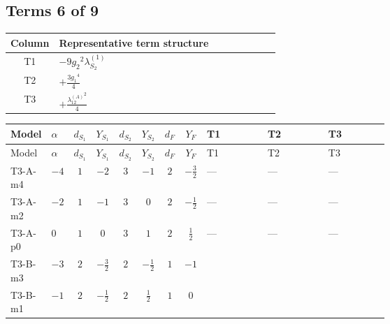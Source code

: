 \documentclass[8pt]{article}
\begin{document}
\begin{landscape}
\subsection*{Terms 6 of 9}
\begin{center}
\begin{tabular}{@{}c >{\raggedright\arraybackslash}p{0.82\linewidth}@{}}
\toprule
Column & Representative term structure \\
\midrule
T1 & \(\displaystyle -9 {g_2}^2 {\lambda_{S_2}^{(1)}}\) \\
\midrule
T2 & \(\displaystyle +\frac{3 {g_1}^4}{4}\) \\
\midrule
T3 & \(\displaystyle +\frac{{\lambda_{12}^{(A)}}^2}{4}\) \\
\midrule
\bottomrule
\end{tabular}
\end{center}
\smallskip
\tiny
\begin{longtable}{@{}llcccccc >{\raggedright\arraybackslash}p{0.21\linewidth} >{\raggedright\arraybackslash}p{0.21\linewidth} >{\raggedright\arraybackslash}p{0.21\linewidth}@{}}
\toprule
Model & $\alpha$ & $d_{S_1}$ & $Y_{S_1}$ & $d_{S_2}$ & $Y_{S_2}$ & $d_F$ & $Y_F$ & T1 & T2 & T3 \\
\midrule
\endfirsthead
\toprule
Model & $\alpha$ & $d_{S_1}$ & $Y_{S_1}$ & $d_{S_2}$ & $Y_{S_2}$ & $d_F$ & $Y_F$ & T1 & T2 & T3 \\
\midrule
\endhead
T3-A-m4 & $-4$ & $1$ & $-2$ & $3$ & $-1$ & $2$ & $-\frac{3}{2}$ & --- & --- & --- \\
\midrule
T3-A-m2 & $-2$ & $1$ & $-1$ & $3$ & $0$ & $2$ & $-\frac{1}{2}$ & --- & --- & --- \\
\midrule
T3-A-p0 & $0$ & $1$ & $0$ & $3$ & $1$ & $2$ & $\frac{1}{2}$ & --- & --- & --- \\
\midrule
T3-B-m3 & $-3$ & $2$ & $-\frac{3}{2}$ & $2$ & $-\frac{1}{2}$ & $1$ & $-1$ & \scriptsize\adjustbox{max width=\linewidth}{$\begin{gathered} -9 {g_2}^2 {\lambda_{S_2}^{(1)}}\end{gathered}$} & \scriptsize\adjustbox{max width=\linewidth}{$\begin{gathered} +\frac{3 {g_1}^4}{4}\end{gathered}$} & \scriptsize\adjustbox{max width=\linewidth}{$\begin{gathered} +\frac{{\lambda_{12}^{(A)}}^2}{4}\end{gathered}$} \\
\midrule
T3-B-m1 & $-1$ & $2$ & $-\frac{1}{2}$ & $2$ & $\frac{1}{2}$ & $1$ & $0$ & \scriptsize\adjustbox{max width=\linewidth}{$\begin{gathered} -9 {g_2}^2 {\lambda_{S_2}^{(1)}}\end{gathered}$} & \scriptsize\adjustbox{max width=\linewidth}{$\begin{gathered} +\frac{3 {g_1}^4}{4}\end{gathered}$} & \scriptsize\adjustbox{max width=\linewidth}{$\begin{gathered} +\frac{{\lambda_{12}^{(A)}}^2}{4}\end{gathered}$} \\

\end{longtable}
\end{landscape}
\end{document}
